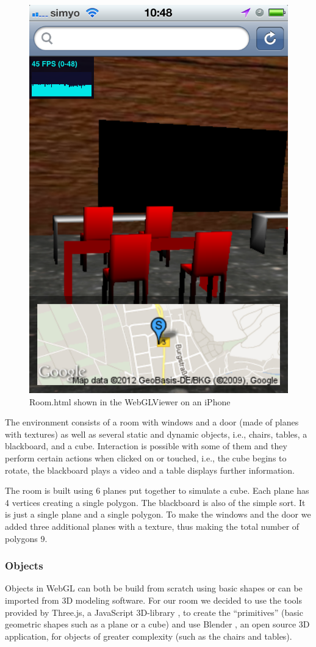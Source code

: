 \documentclass[12pt,journal,compsoc]{IEEEtran}
\begin{document}
\begin{figure}[htb]
	\centerline{\includegraphics[width=0.7\columnwidth]{grafiken/room_Mobile}}
	\caption{Room.html shown in the WebGLViewer on an iPhone}
	\label{fig:roomMobile}
\end{figure}

The environment consists of a room with windows and a door (made of planes with textures) as well as several static and dynamic objects, i.e., chairs, tables, a blackboard, and a cube. Interaction is possible with some of them and they perform certain actions when clicked on or touched, i.e., the cube begins to rotate, the blackboard plays a video and a table displays further information.

The room is built using 6 planes put together to simulate a cube. Each plane has 4 vertices creating a single polygon. The blackboard is also of the simple sort. It is just a single plane and a single polygon. To make the windows and the door we added three additional planes with a texture, thus making the total number of polygons 9.

\subsubsection{Objects}
Objects in WebGL can both be build from scratch using basic shapes or can be imported from 3D modeling software. For our room we decided to use the tools provided by Three.js, a JavaScript 3D-library \cite{ThreeJS}, to create the “primitives” (basic geometric shapes such as a plane or a cube) and use Blender \cite{Blender3d}, an open source 3D application, for objects of greater complexity (such as the chairs and tables).
\end{document}
